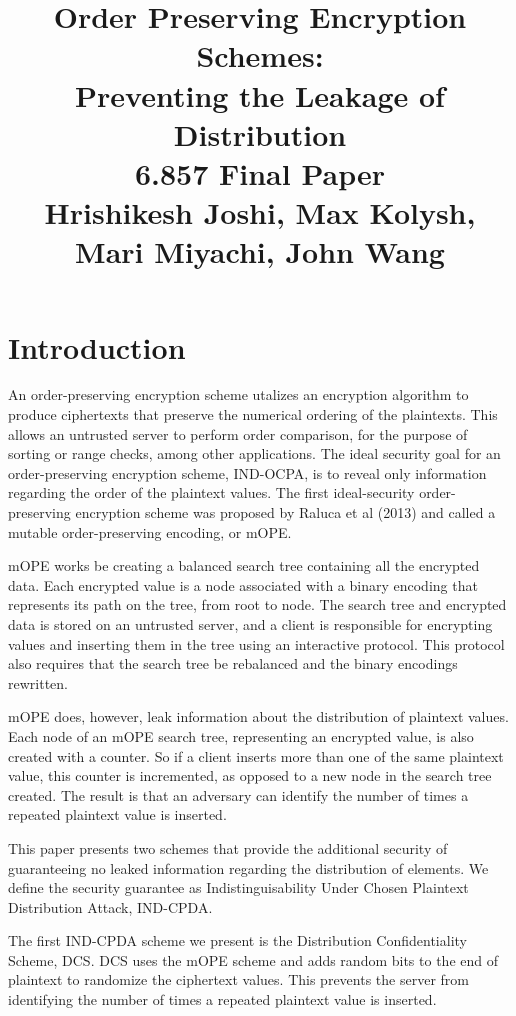 \documentclass[12pt]{article}
\title{Order Preserving Encryption Schemes: \\
  Preventing the Leakage of Distribution\\
6.857 Final Paper \\
Hrishikesh Joshi, Max Kolysh, Mari Miyachi, John Wang}
\begin{document}
\maketitle

\section{Introduction}
An order-preserving encryption scheme utalizes an encryption algorithm to produce ciphertexts that preserve the numerical ordering of the plaintexts. This allows an untrusted server to perform order comparison, for the purpose of sorting or range checks, among other applications. The ideal security goal for an order-preserving encryption scheme, IND-OCPA, is to reveal only information regarding the order of the plaintext values. The first ideal-security order-preserving encryption scheme was proposed by Raluca et al (2013) and called a mutable order-preserving encoding, or mOPE. 

mOPE works be creating a balanced search tree containing all the encrypted data. Each encrypted value is a node associated with a binary encoding that represents its path on the tree, from root to node. The search tree and encrypted data is stored on an untrusted server, and a client is responsible for encrypting values and inserting them in the tree using an interactive protocol. This protocol also requires that the search tree be rebalanced and the binary encodings rewritten.

mOPE does, however, leak information about the distribution of plaintext values. Each node of an mOPE search tree, representing an encrypted value, is also created with a counter. So if a client inserts more than one of the same plaintext value, this counter is incremented, as opposed to a new node in the search tree created. The result is that an adversary can identify the number of times a repeated plaintext value is inserted.

This paper presents two schemes that provide the additional security of guaranteeing no leaked information regarding the distribution of elements. We define the security guarantee as Indistinguisability Under Chosen Plaintext Distribution Attack, IND-CPDA. 

The first IND-CPDA scheme we present is the Distribution Confidentiality Scheme, DCS. DCS uses the mOPE scheme and adds random bits to the end of plaintext to randomize the ciphertext values. This prevents the server from identifying the number of times a repeated plaintext value is inserted.
\end{document}
